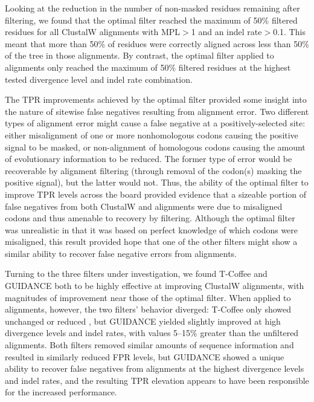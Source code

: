 \documentclass{mbe}
\begin{document}
Looking at the reduction in the number of non-masked residues
remaining after filtering, we found that the optimal filter reached
the maximum of 50\% filtered residues for all ClustalW alignments with
MPL$>$1 and an indel rate$>$0.1. This meant that more than 50\% of
residues were correctly aligned across less than 50\% of the tree in
those alignments. By contrast, the optimal filter applied to \prankc
alignments only reached the maximum of 50\% filtered residues at the
highest tested divergence level and indel rate combination.

The TPR improvements achieved by the optimal filter provided some
insight into the nature of sitewise false negatives resulting from
alignment error. Two different types of alignment error might cause a
false negative at a positively-selected site: either misalignment of
one or more nonhomologous codons causing the positive signal to be
masked, or non-alignment of homologous codons causing the amount of
evolutionary information to be reduced. The former type of error would
be recoverable by alignment filtering (through removal of the codon(s)
masking the positive signal), but the latter would not. Thus, the
ability of the optimal filter to improve TPR levels across the board
provided evidence that a sizeable portion of false negatives from both
ClustalW and \prankc alignments were due to misaligned codons and thus
amenable to recovery by filtering. Although the optimal filter was
unrealistic in that it was based on perfect knowledge of which codons
were misaligned, this result provided hope that one of the other
filters might show a similar ability to recover false negative errors
from \prankc alignments.

Turning to the three filters under investigation, we found T-Coffee
and GUIDANCE both to be highly effective at improving ClustalW
alignments, with magnitudes of improvement near those of the optimal
filter. When applied to \prankc alignments, however, the two filters'
behavior diverged: T-Coffee only showed unchanged or reduced \tpr, but
GUIDANCE yielded slightly improved \tpr at high divergence levels and
indel rates, with values 5--15\% greater than the unfiltered \prankc
alignments. Both filters removed similar amounts of sequence
information and resulted in similarly reduced FPR levels, but GUIDANCE
showed a unique ability to recover false negatives from \prankc
alignments at the highest divergence levels and indel rates, and the
resulting TPR elevation appears to have been responsible for the
increased \tpr performance.
\end{document}

